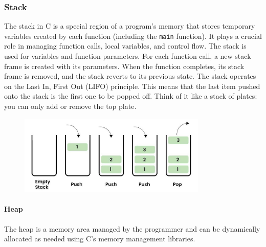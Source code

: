 \subsubsection{Stack}
The stack in C is a special region of a program's memory that stores temporary variables created by each function (including the \texttt{main} function). It plays a crucial role in managing function calls, local variables, and control flow.
The stack is used for variables and function parameters. For each function call, a new stack frame is created with its parameters. When the function completes, its stack frame is removed, and the stack reverts to its previous state. The stack operates on the Last In, First Out (LIFO) principle. This means that the last item pushed onto the stack is the first one to be popped off. Think of it like a stack of plates: you can only add or remove the top plate.

\begin{figure}[h!]
    \centering
    \includegraphics[width=0.8\textwidth]{images/lifo.jpg}
\end{figure}

\paragraph{Heap}
The heap is a memory area managed by the programmer and can be dynamically allocated as needed using C's memory management libraries.

